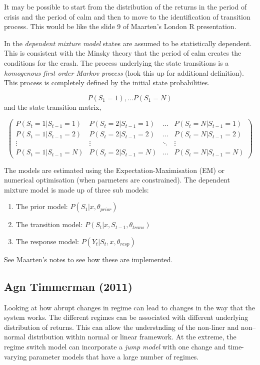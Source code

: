 \documentclass[12pt, a4paper, oneside]{article} %
\begin{document}
It may be possible to start from the distribution of the returns in the period of crisis and the period of calm and then to move to the identification of transition process.  This would be like the slide 9 of Maarten's London R presentation. 

In the \emph{dependent mixture model} states are assumed to be statistically dependent.  This is consistent with the Minsky theory that the period of calm creates the conditions for the crash. The process underlying the state transitions is a \emph{homogenous first order Markov process}  (look this up for additional definition).  This process is completely defined by the initial state probabilities.  

\begin{equation*}
P(S_1 = 1), \dots P(S_1 = N)
\end{equation*}
and the state transition matrix, 

\begin{equation*}
\begin{pmatrix}
P(S_t = 1|S_{t-1}=1) & P(S_t = 2|S_{t-1}=1) & \dots & P(S_t = N|S_{t-1}=1)\\
P(S_t = 1|S_{t-1}=2) & P(S_t = 2|S_{t-1}=2) & \dots & P(S_t = N|S_{t-1}=2)\\
\vdots & \vdots & \ddots & \vdots \\
P(S_t = 1|S_{t-1}=N) & P(S_t = 2|S_{t-1}=N) & \dots & P(S_t = N|S_{t-1}=N)
\end{pmatrix}
\end{equation*}

The models are estimated using the Expectation-Maximisation (EM) or numerical optimisation (when parmeters are constrained).  The dependent mixture model is made up of three sub models:  
\begin{enumerate}
\item The prior model: $P(S_1|x, \theta_{prior})$
\item The transition model: $P(S_t|x, S_{t-1}, \theta_{trans})$
\item The response model: $P(Y_t| S_t, x, \theta_{resp})$
\end{enumerate}
 See Maarten's notes to see how these are implemented.  
 
\subsection{Agn Timmerman (2011)}
Looking at how abrupt changes in regime can lead to changes in the way that the system works.  The different regimes can be associated with different underlying distribution of returns.  This can allow the understnding of the non-liner and non--normal distribution within  normal or linear framework.  At the extreme, the regime switch model can incorporate a \emph{jump model} with one change and time-varying parameter models that have a large number of regimes.
\end{document}
